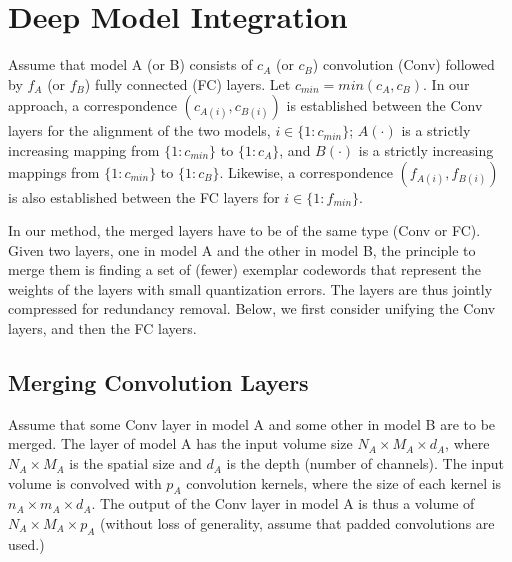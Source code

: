 \documentclass{article}
\begin{document}
	
	\section{Deep Model Integration}
	Assume that model A (or B) consists of $c_A$ (or $c_B$) convolution (Conv) followed by $f_A$ (or $f_B$) fully connected (FC) layers.
	Let $c_{min}=min(c_A,c_B)$.
	In our approach, a correspondence $(c_{A(i)},c_{B(i)})$ is established between the Conv layers for the alignment of the two models, $i \in \{1:c_{min}\}$; $A(\cdot)$ is a strictly increasing mapping from $\{1:c_{min}\}$ to $\{1:c_A\}$, and $B(\cdot)$ is a strictly increasing mappings from $\{1:c_{min}\}$ to $\{1:c_B\}$.
	Likewise, a correspondence $(f_{A(i)},f_{B(i)})$ is also established between the FC layers for $i \in \{1:f_{min}\}$.
	
	In our method, the merged layers have to be of the same type (Conv or FC).
	Given two layers, one in model A and the other in model B, the principle to merge them is finding a set of (fewer) exemplar codewords that represent the weights of the layers with small quantization errors.
	The layers are thus jointly compressed for redundancy removal.
	Below, we first consider unifying the Conv layers, and then the FC layers.
	
	\subsection{Merging Convolution Layers}
	
	Assume that some Conv layer in model A and some other in model B are to be merged.
	The layer of model A has the input volume size $N_A \times M_A \times d_A$, where $N_A\times M_A$ is the spatial size and $d_A$ is the depth (number of channels).
	The input volume is convolved with $p_A$ convolution kernels, where the size of each kernel is $n_A \times m_A \times d_A$.
	The output of the Conv layer in model A is thus a volume of $N_A \times M_A \times p_A$ (without loss of generality, assume that padded convolutions are used.)
	
\end{document}

